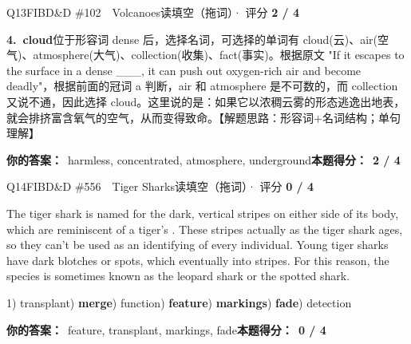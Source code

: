 \begin{qblock}{Q13\quad FIBD\&D \#102\ \ Volcanoes}{读填空（拖词）· 评分 \textcolor{cAccent}{\bfseries 2 / 4}}
\begin{notebox}
\textbf{4.\ cloud}\quad 位于形容词 dense 后，选择名词，可选择的单词有 cloud(云)、air(空气)、atmosphere(大气)、collection(收集)、fact(事实)。根据原文 "If it escapes to the surface in a dense \_\_\_, it can push out oxygen-rich air and become deadly"，根据前面的冠词 a 判断，air 和 atmosphere 是不可数的，而 collection 又说不通，因此选择 cloud。这里说的是：如果它以浓稠云雾的形态逃逸出地表，就会排挤富含氧气的空气，从而变得致命。【解题思路：形容词+名词结构；单句理解】
\end{notebox}
\par\smallskip
\textbf{你的答案：}\ harmless, concentrated, {\color{cWrong}atmosphere, underground}\qquad\textbf{本题得分：}\ {\color{cAccent}\bfseries 2 / 4}
\end{qblock}

\begin{qblock}{Q14\quad FIBD\&D \#556\ \ Tiger Sharks}{读填空（拖词）· 评分 \textcolor{cAccent}{\bfseries 0 / 4}}
\begin{promptbox}
The tiger shark is named for the dark, vertical stripes on either side of its body, which are reminiscent of a tiger's . These stripes actually  as the tiger shark ages, so they can't be used as an identifying  of every individual. Young tiger sharks have dark blotches or spots, which eventually  into stripes. For this reason, the species is sometimes known as the leopard shark or the spotted shark.
\end{promptbox}
{\small 1) transplant) \textbf{merge}) function) \textbf{feature}) \textbf{markings}) \textbf{fade}) detection}
\par\smallskip
\textbf{你的答案：}\ {\color{cWrong}feature, transplant, markings, fade}\qquad\textbf{本题得分：}\ {\color{cAccent}\bfseries 0 / 4}
\end{qblock}

